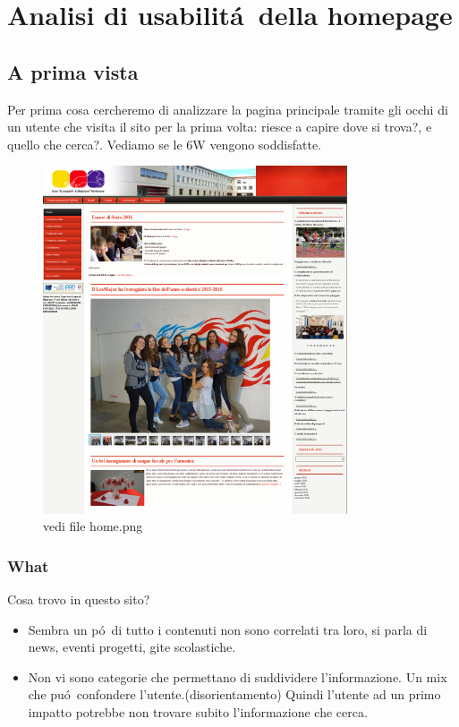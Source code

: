 \documentclass[12pt]{article}
\begin{document}
\section{Analisi di usabilit\'a\ della homepage}
\subsection{A prima vista}
Per prima cosa cercheremo di analizzare la pagina principale tramite gli occhi di un utente che visita il sito per la prima volta: riesce a capire dove si trova?, e quello che cerca?. Vediamo se le 6W vengono soddisfatte.

\begin{figure}[ht!]
\centering
\includegraphics[width=90mm]{home}
\caption{vedi file home.png}
\end{figure} 

\newpage
\subsubsection{What} Cosa trovo in questo sito?
\begin{itemize}
	\item Sembra un p\'o\ di tutto i contenuti non sono correlati tra loro, si parla di news, eventi progetti, gite scolastiche. 

	\item Non vi sono categorie che permettano di suddividere l'informazione. Un mix che pu\'o\ confondere l'utente.(disorientamento) Quindi l'utente ad un primo impatto potrebbe non trovare subito l'informazione che cerca. 

\end{itemize}
\end{document}
